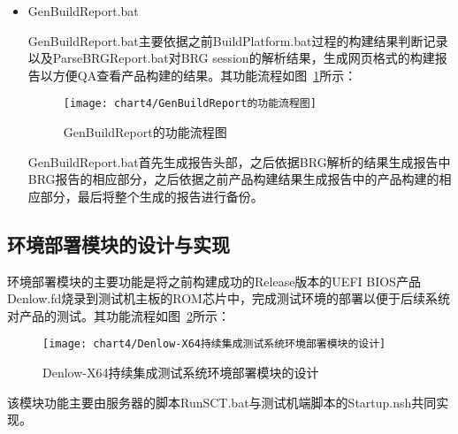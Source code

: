 \begin{itemize}
			\item GenBuildReport.bat
				
				GenBuildReport.bat主要依据之前BuildPlatform.bat过程的构建结果判断记录以及ParseBRGReport.bat对BRG session的解析结果，生成网页格式的构建报告以方便QA查看产品构建的结果。其功能流程如图~\ref{fig:GenDenlowBuildReport的功能流程图}所示：
				
				\begin{figure}[H] %
					\centering
					\texttt{[image: chart4/GenBuildReport的功能流程图]}
					\caption{GenBuildReport的功能流程图}
					\label{fig:GenDenlowBuildReport的功能流程图}
				\end{figure}
				
				GenBuildReport.bat首先生成报告头部，之后依据BRG解析的结果生成报告中BRG报告的相应部分，之后依据之前产品构建结果生成报告中的产品构建的相应部分，最后将整个生成的报告进行备份。
		\end{itemize}
		
	\subsection{环境部署模块的设计与实现}
		
		环境部署模块的主要功能是将之前构建成功的Release版本的UEFI BIOS产品Denlow.fd烧录到测试机主板的ROM芯片中，完成测试环境的部署以便于后续系统对产品的测试。其功能流程如图~\ref{fig:Denlow-X64持续集成测试系统环境部署模块的设计}所示：
		
		\begin{figure}[H] %
			\centering
			\texttt{[image: chart4/Denlow-X64持续集成测试系统环境部署模块的设计]}
			\caption{Denlow-X64持续集成测试系统环境部署模块的设计}
			\label{fig:Denlow-X64持续集成测试系统环境部署模块的设计}
		\end{figure}
		
		该模块功能主要由服务器的脚本RunSCT.bat与测试机端脚本的Startup.nsh共同实现。
		
